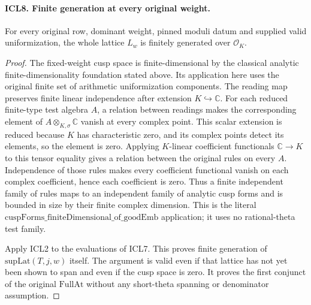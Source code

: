 \documentclass[11pt,a4paper]{article}
\numberwithin{equation}{section}
\theoremstyle{remark}\newtheorem{remark}[theorem]{Remark}
\begin{document}
\paragraph{ICL8. Finite generation at every original weight.}
\label{claim:ICL8}
For every original row, dominant weight, pinned moduli datum
and supplied valid uniformization, the whole lattice
\(L_w\) is finitely generated over \(\mathcal O_K\).
\begin{proof}
The fixed-weight cusp space is finite-dimensional by the
classical analytic finite-dimensionality foundation stated
above.  Its application here uses the original finite set
of arithmetic uniformization components.  The reading map
preserves finite linear independence after extension
\(K\hookrightarrow\mathbb C\).  For each reduced finite-type
test algebra \(A\), a relation between readings makes the
corresponding element of \(A\otimes_{K,\sigma}\mathbb C\)
vanish at every complex point.  This scalar extension is
reduced because \(K\) has characteristic zero, and its
complex points detect its elements, so the element is
zero.  Applying \(K\)-linear coefficient functionals
\(\mathbb C\to K\) to this tensor equality gives a
relation between the original rules on every \(A\).
Independence of those rules makes every coefficient
functional vanish on each complex coefficient, hence
each coefficient is zero.  Thus a finite
independent family of rules maps to an independent family
of analytic cusp forms and is bounded in size by their
finite complex dimension.  This is the literal
\(\mathrm{cuspForms\_\allowbreak finiteDimensional\_\allowbreak of\_\allowbreak goodEmb}\)
application; it uses no rational-theta test family.

Apply ICL2 to the evaluations of ICL7.  This proves finite
generation of \(\mathrm{supLat}(T,j,w)\) itself.  The
argument is valid even if that lattice has not yet been
shown to span and even if the cusp space is zero.  It proves
the first conjunct of the original \(\mathrm{FullAt}\)
without any short-theta spanning or denominator assumption.
\end{proof}

\end{document}
